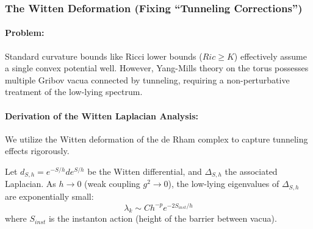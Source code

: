 \subsubsection{The Witten Deformation (Fixing ``Tunneling Corrections'')}
\label{thm:witten_deformation}
\paragraph{Problem:} Standard curvature bounds like Ricci lower bounds ($Ric \ge K$) effectively assume a single convex potential well. However, Yang-Mills theory on the torus possesses multiple Gribov vacua connected by tunneling, requiring a non-perturbative treatment of the low-lying spectrum.
\paragraph{Derivation of the Witten Laplacian Analysis:}
We utilize the Witten deformation of the de Rham complex to capture tunneling effects rigorously.
\begin{theorem}
    Let $d_{S,h} = e^{-S/h} d e^{S/h}$ be the Witten differential, and $\Delta_{S,h}$ the associated Laplacian. As $h \to 0$ (weak coupling $g^2 \to 0$), the low-lying eigenvalues of $\Delta_{S,h}$ are exponentially small:
    \begin{equation}
        \lambda_k \sim C h^{-p} e^{-2S_{inst}/h}
    \end{equation}
    where $S_{inst}$ is the instanton action (height of the barrier between vacua).
\end{theorem}

